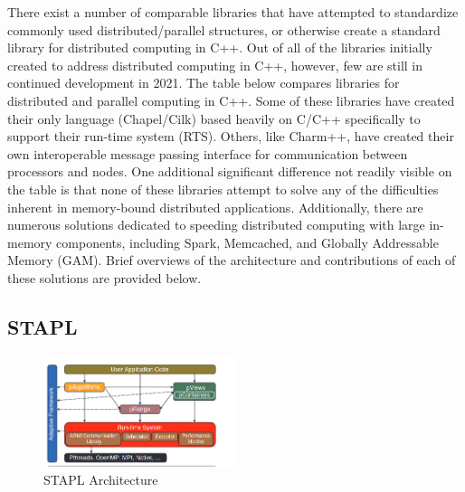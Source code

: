 \normalsize
There exist a number of comparable libraries that have attempted to standardize commonly used distributed/parallel structures, or otherwise create a standard library for distributed computing in C++. Out of all of the libraries initially created to address distributed computing in C++, however, few are still in continued development in 2021. The table below compares libraries for distributed and parallel computing in C++. Some of these libraries have created their only language (Chapel/Cilk) based heavily on C/C++ specifically to support their run-time system (RTS). Others, like Charm++, have created their own interoperable message passing interface for communication between processors and nodes.  One additional significant difference not readily visible on the table is that none of these libraries attempt to solve any of the difficulties inherent in memory-bound distributed applications. Additionally, there are numerous solutions dedicated to speeding distributed computing with large in-memory components, including Spark, Memcached, and Globally Addressable Memory (GAM). Brief overviews of the architecture and contributions of each of these solutions are provided below.   

\subsection{STAPL}
\begin{figure}[h]
\centering
\includegraphics[width=0.5\textwidth]{Figures/stapl_overview.png}
\caption{STAPL Architecture \cite{stapl_parallel_container}}
\label{fig:stapl_arch}
\end{figure}
